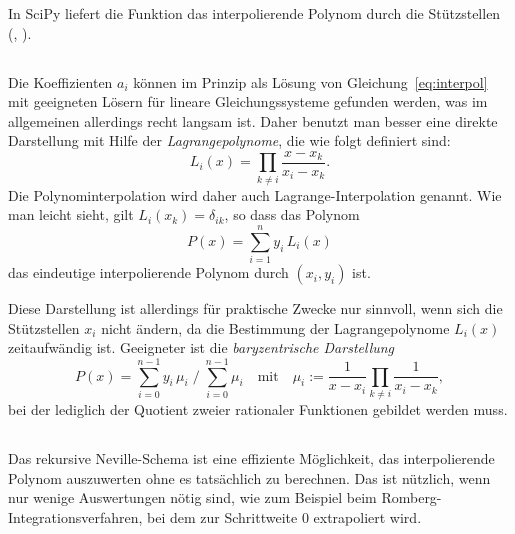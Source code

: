 In SciPy liefert die Funktion 
das interpolierende Polynom durch die Stützstellen (,
).

\subsection{}

Die Koeffizienten $a_i$ können im Prinzip als Lösung von
Gleichung~\eqref{eq:interpol} mit geeigneten Lösern für lineare
Gleichungssysteme gefunden werden, was im allgemeinen allerdings recht
langsam ist. Daher benutzt man besser eine direkte Darstellung mit
Hilfe der \emph{Lagrangepolynome}, die wie folgt definiert sind:
\begin{equation}
  \label{eq:lagrange}
  L_i(x) = \prod_{k\neq i} \frac{x-x_k}{x_i-x_k}.
\end{equation}
Die Polynominterpolation wird daher auch Lagrange-Interpolation
genannt.  Wie man leicht sieht, gilt $L_i(x_k) = \delta_{ik}$, so dass
das Polynom
\begin{equation}
  P(x) = \sum_{i=1}^n y_i\,L_i(x)
\end{equation}
das eindeutige interpolierende Polynom durch $(x_i, y_i)$
ist.

Diese Darstellung ist allerdings für praktische Zwecke nur sinnvoll,
wenn sich die Stützstellen $x_i$ nicht ändern, da die Bestimmung der
Lagrangepolynome $L_i(x)$ zeitaufwändig ist. Geeigneter ist die
\emph{baryzentrische Darstellung}
\begin{equation}
P(x) = \sum_{i=0}^{n-1} y_i\, \mu_i \; \Big/ \; \sum_{i=0}^{n-1}
\mu_i\quad\text{mit}\quad
\mu_i := \frac{1}{x-x_i}\prod_{k\neq i}\frac{1}{x_i-x_k},
\end{equation}
bei der lediglich der Quotient zweier rationaler Funktionen gebildet
werden muss. 

\subsection{}

Das rekursive Neville-Schema ist eine effiziente Möglichkeit, das
interpolierende Polynom auszuwerten ohne es tatsächlich zu
berechnen. Das ist nützlich, wenn nur wenige Auswertungen nötig sind,
wie zum Beispiel beim Romberg-Integrationsverfahren, bei dem zur
Schrittweite 0 extrapoliert wird.

